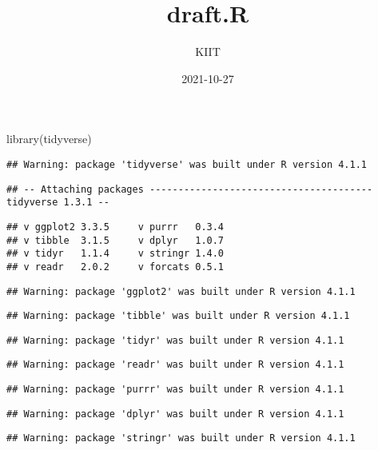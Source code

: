 \documentclass[
]{article}
\title{draft.R}
\author{KIIT}
\date{2021-10-27}
\newenvironment{Shaded}{\begin{snugshade}}{\end{snugshade}}
\newcommand{\FunctionTok}[1]{\textcolor[rgb]{0.00,0.00,0.00}{#1}}
\newcommand{\NormalTok}[1]{#1}
\begin{document}
\maketitle

\begin{Shaded}
\begin{Highlighting}[]
\FunctionTok{library}\NormalTok{(tidyverse)}
\end{Highlighting}
\end{Shaded}

\begin{verbatim}
## Warning: package 'tidyverse' was built under R version 4.1.1
\end{verbatim}

\begin{verbatim}
## -- Attaching packages --------------------------------------- tidyverse 1.3.1 --
\end{verbatim}

\begin{verbatim}
## v ggplot2 3.3.5     v purrr   0.3.4
## v tibble  3.1.5     v dplyr   1.0.7
## v tidyr   1.1.4     v stringr 1.4.0
## v readr   2.0.2     v forcats 0.5.1
\end{verbatim}

\begin{verbatim}
## Warning: package 'ggplot2' was built under R version 4.1.1
\end{verbatim}

\begin{verbatim}
## Warning: package 'tibble' was built under R version 4.1.1
\end{verbatim}

\begin{verbatim}
## Warning: package 'tidyr' was built under R version 4.1.1
\end{verbatim}

\begin{verbatim}
## Warning: package 'readr' was built under R version 4.1.1
\end{verbatim}

\begin{verbatim}
## Warning: package 'purrr' was built under R version 4.1.1
\end{verbatim}

\begin{verbatim}
## Warning: package 'dplyr' was built under R version 4.1.1
\end{verbatim}

\begin{verbatim}
## Warning: package 'stringr' was built under R version 4.1.1
\end{verbatim}
\end{document}
